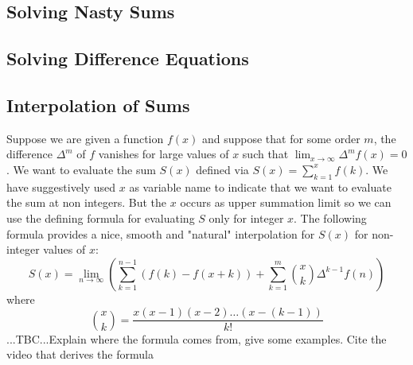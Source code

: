 \subsection{Solving Nasty Sums}

\subsection{Solving Difference Equations}


\subsection{Interpolation of Sums}
Suppose we are given a function $f(x)$ and suppose that for some order $m$, the difference $\Delta^m$ of $f$ vanishes for large values of $x$ such that $\lim_{x \rightarrow \infty} \Delta^m f(x) = 0$. We want to evaluate the sum $S(x)$ defined via $S(x) = \sum_{k=1}^{x} f(k)$. We have suggestively used $x$ as variable name to indicate that we want to evaluate the sum at non integers. But the $x$ occurs as upper summation limit so we can use the defining formula for evaluating $S$ only for integer $x$. The following formula provides a nice, smooth and "natural" interpolation for $S(x)$ for non-integer values of $x$:
\begin{equation}
S(x) = \lim_{n \rightarrow \infty} 
\left(   \sum_{k=1}^{n-1} \left(f(k) - f(x+k) \right) 
       + \sum_{k=1}^{m} \binom{x}{k} \Delta^{k-1} f(n)  \right)
\end{equation}
where
\begin{equation}
\binom{x}{k} = \frac{x (x-1) (x-2) \ldots (x-(k-1)) }{k!}
\end{equation}
...TBC...Explain where the formula comes from, give some examples. Cite the video that derives the formula



